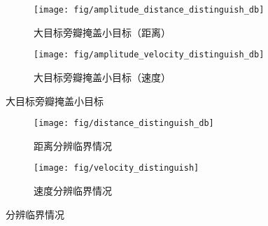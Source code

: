\documentclass[../main]{subfiles}
\begin{document}
\begin{figure}[htbp]
  \centering
  \begin{subfigure}[htbp]{0.45\linewidth}
    \centering
    \texttt{[image: fig/amplitude\_distance\_distinguish\_db]}
    \caption{大目标旁瓣掩盖小目标（距离）}%
    \label{fig:amplitude_distance_distinguish_db}
  \end{subfigure}
  \quad
  \begin{subfigure}[htbp]{0.45\linewidth}
    \centering
    \texttt{[image: fig/amplitude\_velocity\_distinguish\_db]}
    \caption{大目标旁瓣掩盖小目标（速度）}%
    \label{fig:amplitude_velocity_distinguish_db}
  \end{subfigure}
  \caption{大目标旁瓣掩盖小目标}%
  \label{fig:amplitude_distinguish_db}
\end{figure}

\begin{figure}[htbp]
  \centering
  \begin{subfigure}[htbp]{0.45\linewidth}
    \centering
    \texttt{[image: fig/distance\_distinguish\_db]}
    \caption{距离分辨临界情况}%
    \label{fig:distance_distinguish_db}
  \end{subfigure}
  \quad
  \begin{subfigure}[htbp]{0.45\linewidth}
    \centering
    \texttt{[image: fig/velocity\_distinguish]}
    \caption{速度分辨临界情况}%
    \label{fig:velocity_distinguish}
  \end{subfigure}
  \caption{分辨临界情况}%
  \label{fig:distinguish}
\end{figure}
\end{document}
